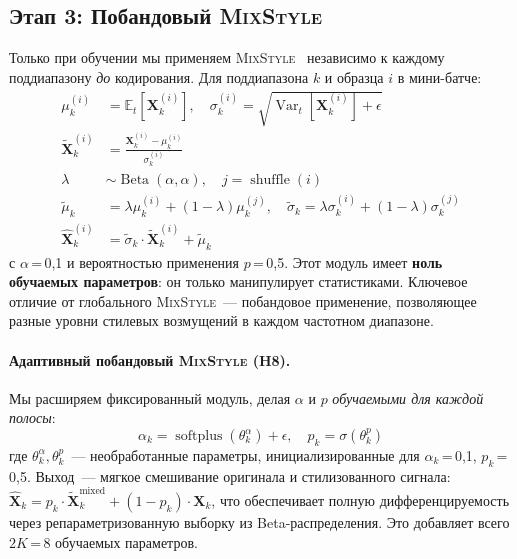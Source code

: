 \documentclass[conference]{IEEEtran}
\newcommand{\mixstyle}{\textsc{MixStyle}}
\begin{document}
\subsection{Этап 3: Побандовый \mixstyle{}}
\label{sec:mixstyle}
Только при обучении мы применяем \mixstyle{}~\cite{zhou2021mixstyle} независимо к каждому поддиапазону \emph{до} кодирования.
Для поддиапазона $k$ и образца $i$ в мини-батче:
\begin{align}
\mu_k^{(i)} &= \mathbb{E}_t[\mathbf{X}_k^{(i)}], \quad
\sigma_k^{(i)} = \sqrt{\operatorname{Var}_t[\mathbf{X}_k^{(i)}] + \epsilon} \label{eq:ms_stats} \\
\tilde{\mathbf{X}}_k^{(i)} &= \frac{\mathbf{X}_k^{(i)} - \mu_k^{(i)}}{\sigma_k^{(i)}} \label{eq:ms_norm} \\
\lambda &\sim \operatorname{Beta}(\alpha, \alpha), \quad j = \operatorname{shuffle}(i) \label{eq:ms_lambda} \\
\tilde{\mu}_k &= \lambda \mu_k^{(i)} + (1-\lambda) \mu_k^{(j)}, \quad
\tilde{\sigma}_k = \lambda \sigma_k^{(i)} + (1-\lambda) \sigma_k^{(j)} \label{eq:ms_mix} \\
\hat{\mathbf{X}}_k^{(i)} &= \tilde{\sigma}_k \cdot \tilde{\mathbf{X}}_k^{(i)} + \tilde{\mu}_k \label{eq:ms_out}
\end{align}
с $\alpha$\,=\,0,1 и вероятностью применения $p$\,=\,0,5.
Этот модуль имеет \textbf{ноль обучаемых параметров}: он только манипулирует статистиками.
Ключевое отличие от глобального \mixstyle{}~--- побандовое применение, позволяющее разные уровни стилевых возмущений в каждом частотном диапазоне.

\paragraph{Адаптивный побандовый \mixstyle{} (H8).}
Мы расширяем фиксированный модуль, делая $\alpha$ и $p$ \emph{обучаемыми для каждой полосы}:
\begin{equation}
\alpha_k = \operatorname{softplus}(\theta_k^{\alpha}) + \epsilon, \quad
p_k = \sigma(\theta_k^{p})
\label{eq:adaptive_ms}
\end{equation}
где $\theta_k^{\alpha}, \theta_k^{p}$~--- необработанные параметры, инициализированные для $\alpha_k$\,=\,0,1, $p_k$\,=\,0,5.
Выход~--- мягкое смешивание оригинала и стилизованного сигнала:
$\hat{\mathbf{X}}_k = p_k \cdot \tilde{\mathbf{X}}_k^{\mathrm{mixed}} + (1 - p_k) \cdot \mathbf{X}_k$,
что обеспечивает полную дифференцируемость через репараметризованную выборку из Beta-распределения.
Это добавляет всего $2K$\,=\,8 обучаемых параметров.
\end{document}
